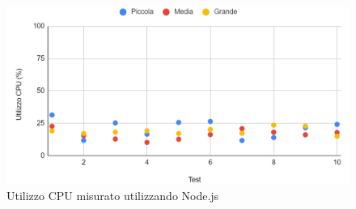 \begin{figure}
    \begin{center}
            \includegraphics[width=1\columnwidth]{images/node_cpu.png}
    \end{center}
    \caption{Utilizzo CPU misurato utilizzando Node.js}
\end{figure}
\newpage
